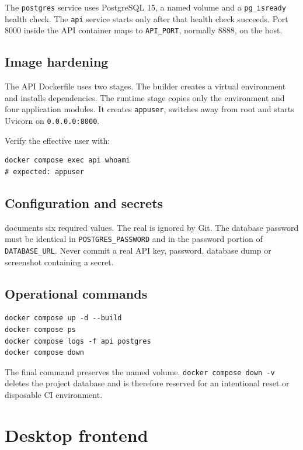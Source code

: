 \documentclass[11pt,a4paper]{article}
\newcommand{\filepath}[1]{\path{#1}}
\begin{document}
The \texttt{postgres} service uses PostgreSQL 15, a named volume and a
\texttt{pg\_isready} health check. The \texttt{api} service starts only after
that health check succeeds. Port 8000 inside the API container maps to
\texttt{API\_PORT}, normally 8888, on the host.

\subsection{Image hardening}

The API Dockerfile uses two stages. The builder creates a virtual environment
and installs dependencies. The runtime stage copies only the environment and
four application modules. It creates \texttt{appuser}, switches away from root
and starts Uvicorn on \texttt{0.0.0.0:8000}.

Verify the effective user with:

\begin{lstlisting}[caption={Checking the API container user}]
docker compose exec api whoami
# expected: appuser
\end{lstlisting}

\subsection{Configuration and secrets}

\filepath{.env.example} documents six required values. The real
\filepath{.env} is ignored by Git. The database password must be identical in
\texttt{POSTGRES\_PASSWORD} and in the password portion of
\texttt{DATABASE\_URL}. Never commit a real API key, password, database dump or
screenshot containing a secret.

\subsection{Operational commands}

\begin{lstlisting}[caption={Normal backend lifecycle}]
docker compose up -d --build
docker compose ps
docker compose logs -f api postgres
docker compose down
\end{lstlisting}

The final command preserves the named volume. \texttt{docker compose down -v}
deletes the project database and is therefore reserved for an intentional
reset or disposable CI environment.

\section{Desktop frontend}
\end{document}
